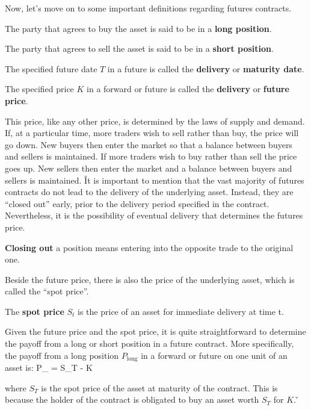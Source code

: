 Now, let's move on to some important definitions regarding futures contracts.

The party that agrees to buy the asset is said to be in a \textbf{long position}.
\ed

The party that agrees to sell the asset is said to be in a \textbf{short position}.
\ed

The specified future date $T$ in a future is called the \textbf{delivery} or \textbf{maturity date}.
\ed

The specified price $K$ in a forward or future is called the \textbf{delivery} or \textbf{future price}.
\ed

This price, like any other price, is determined by the laws of supply and demand. If, at a particular time, more
traders wish to sell rather than buy, the price will go down. New buyers then enter the market so that a balance
between buyers and sellers is maintained. If more traders wish to buy rather than sell the price goes up. New
sellers then enter the market and a balance between buyers and sellers is maintained. \v

It is important to mention that the vast majority of futures contracts do not lead to the delivery of the underlying
asset. Instead, they are ``closed out'' early, prior to the delivery period specified in the contract. Nevertheless,
it is the possibility of eventual delivery that determines the futures price.

\textbf{Closing out} a position means entering into the opposite trade to the original one.
\ed

Beside the future price, there is also the price of the underlying asset, which is called the ``spot price''.

The \textbf{spot price} $S_t$ is the price of an asset for immediate delivery at time t.
\ed

Given the future price and the spot price, it is quite straightforward to determine the payoff from a long or short
position in a future contract. More specifically, the payoff from a long position $P_{\text{long}}$ in a forward or
future on one unit of an asset is:
\bse
P_{} = S_T - K
\ese

where $S_T$ is the spot price of the asset at maturity of the contract. This is because the holder of the contract is
obligated to buy an asset worth $S_T$ for $K$. \v

